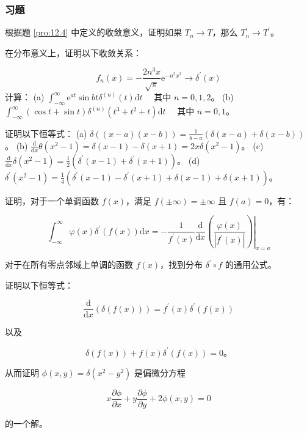 \subsubsection*{习题}
\begin{problem}
  根据题 \ref{pro:12.4} 中定义的收敛意义，证明如果
$T_n \rightarrow T$，那么 $T_n^{\prime} \rightarrow T^{\prime}$。


在分布意义上，证明以下收敛关系：

$$
f_n(x) = -\frac{2 n^3 x}{\sqrt{\pi}} \mathrm{e}^{-n^2 x^2} \rightarrow \delta^{\prime}(x)
$$
计算： (a)
$\int_{-\infty}^\infty \mathrm{e}^{a t} \sin b t \delta^{(n)}(t) \mathrm{d}t \quad$
其中 $n=0,1,2$。 (b)
$\int_{-\infty}^\infty (\cos t + \sin t) \delta^{(n)}\left(t^3 + t^2 + t\right) \mathrm{d}t \quad$
其中 $n=0,1$。
\end{problem}
\begin{problem} 证明以下恒等式： (a)
$\delta((x-a)(x-b)) = \frac{1}{b-a}(\delta(x-a) + \delta(x-b))$。 (b)
$\frac{\mathrm{d}}{\mathrm{d}x} \theta(x^2-1) = \delta(x-1) - \delta(x+1) = 2x \delta(x^2-1)$。
(c)
$\frac{\mathrm{d}}{\mathrm{d}x} \delta(x^2-1) = \frac{1}{2}\left(\delta^{\prime}(x-1) + \delta^{\prime}(x+1)\right)$。
(d)
$\delta^{\prime}(x^2-1) = \frac{1}{4}\left(\delta^{\prime}(x-1) - \delta^{\prime}(x+1) + \delta(x-1) + \delta(x+1)\right)$。

\end{problem}

\begin{problem}
  证明，对于一个单调函数 $f(x)$，满足
$f(\pm \infty) = \pm \infty$ 且 $f(a) = 0$，有：

$$
\int_{-\infty}^\infty \varphi(x) \delta^{\prime}(f(x)) \mathrm{d}x = -\left.\frac{1}{f^{\prime}(x)} \frac{\mathrm{d}}{\mathrm{d}x}\left(\frac{\varphi(x)}{\left|f^{\prime}(x)\right|}\right)\right|_{x=a}
$$

对于在所有零点邻域上单调的函数 $f(x)$，找到分布
$\delta^{\prime} \circ f$ 的通用公式。
\end{problem} 
\begin{problem}
  证明以下恒等式：

$$
\frac{\mathrm{d}}{\mathrm{d}x} (\delta(f(x))) = f^{\prime}(x) \delta^{\prime}(f(x))
$$

以及

$$
\delta(f(x)) + f(x) \delta^{\prime}(f(x)) = 0。
$$

从而证明 $\phi(x, y) = \delta(x^2 - y^2)$ 是偏微分方程

$$
x \frac{\partial \phi}{\partial x} + y \frac{\partial \phi}{\partial y} + 2 \phi(x, y) = 0
$$

的一个解。
\end{problem}


